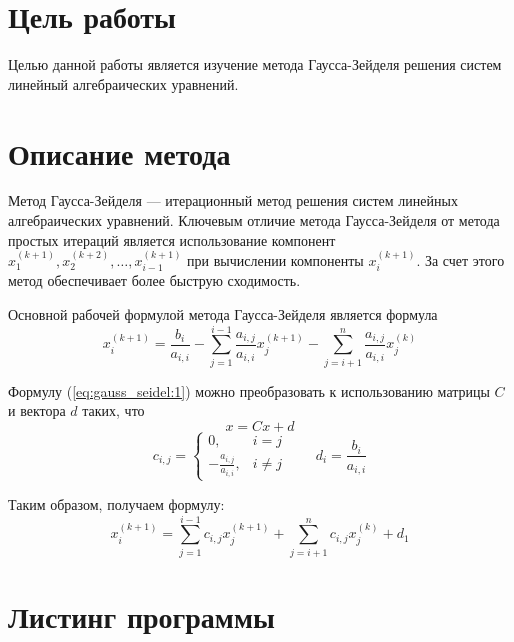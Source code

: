 \section{Цель работы}
Целью данной работы является изучение метода Гаусса-Зейделя решения
систем линейный алгебраических уравнений.

\section{Описание метода}
Метод Гаусса-Зейделя --- итерационный метод решения систем линейных алгебраических
уравнений.
Ключевым отличие метода Гаусса-Зейделя от метода простых итераций является
использование компонент \(x_1^{(k+1)}, x_2^{(k+2)}, \ldots, x_{i-1}^{(k+1)}\)
при вычислении компоненты \(x_i^{(k+1)}\).
За счет этого метод обеспечивает более быструю сходимость.

Основной рабочей формулой метода Гаусса-Зейделя является формула
\begin{equation}
	x_{i}^{(k+1)} = \frac{b_i}{a_{i,i}} - \sum_{j = 1}^{i-1} \frac{a_{i,j}}{a_{i,i}} x_j^{(k+1)} -
	\sum_{j=i+1}^{n} \frac{a_{i,j}}{a_{i,i}} x_{j}^{(k)}
	\label{eq:gauss_seidel:1}
\end{equation}

Формулу (\ref{eq:gauss_seidel:1}) можно преобразовать к использованию матрицы \(C\) и вектора \(d\) таких, что
\[ x = Cx + d \]
\[
	c_{i,j} = \begin{cases}
		0,                         & i = j    \\
		- \frac{a_{i,j}}{a_{i,i}}, & i \neq j
	\end{cases}
	\qquad
	d_i = \frac{b_i}{a_{i,i}}
\]

Таким образом, получаем формулу:
\begin{equation}
	x_{i}^{(k+1)} = \sum_{j=1}^{i-1} c_{i,j} x_j^{(k+1)}
	+ \sum_{j=i+1}^{n} c_{i,j} x_j^{(k)} + d_1
	\label{eq:gauss_seidel:2}
\end{equation}

\section{Листинг программы}
\inputminted[breaklines]{Rust}{./src/solution.rs}

